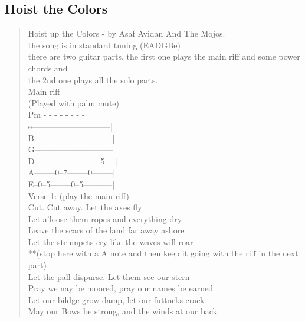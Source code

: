 \documentclass[11pt]{article}
\begin{document}
\subsection{Hoist the Colors}
\label{sec:orga016539}
\begin{verse}
Hoist up the Colors - by Asaf Avidan And The Mojos.\\
\vspace*{1em}
the song is in standard tuning (EADGBe)\\
there are two guitar parts, the first one plays the main riff and some power chords and\\
the 2nd one plays all the solo parts.\\
\vspace*{1em}
Main riff\Intro\\
(Played with palm mute)\\
Pm -  -  -  -  -  -  -   -\\
e-----------------------------|\\
B-----------------------------|\\
G-----------------------------|\\
D------------------------5----|\\
A--------0--7--------0--------|\\
E--0--5--------0--5-----------|\\
\vspace*{1em}
\vspace*{1em}
Verse 1: (play the main riff)\\
\vspace*{1em}
Cut. Cut away. Let the axes fly\\
Let a'loose them ropes and everything dry\\
Leave the scars of the land far away ashore\\
Let the strumpets cry like the waves will roar\\
\vspace*{1em}
**(stop here with a A note and then keep it going with the riff in the next part)\\
\vspace*{1em}
Let the pall dispurse. Let them see our stern\\
Pray we nay be moored, pray our names be earned\\
Let our bildge grow damp, let our futtocks crack\\
May our Bows be strong, and the winds at our back\\
\vspace*{1em}

\end{verse}
\end{document}
